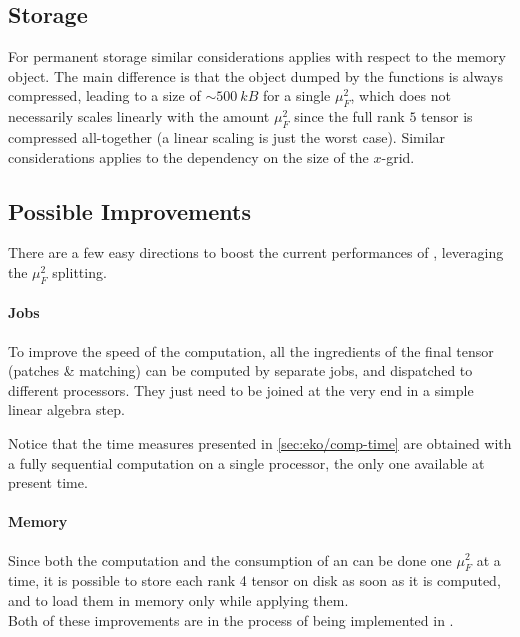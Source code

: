 \subsection{Storage}
\label{sec:eko/storage}

For permanent storage similar considerations applies with respect to the
memory object.
The main difference is that the object dumped by the \eko{} functions is always
compressed, leading to a size of $\sim \SI{500}{kB}$ for a single $\mu_F^2$,
which does not necessarily scales linearly with the amount $\mu_F^2$ since the
full rank $5$ tensor is compressed all-together (a linear scaling is just
the worst case).
Similar considerations applies to the dependency on the size of the $x$-grid.

\subsection{Possible Improvements}

There are a few easy directions to boost the current performances
of \eko{}, leveraging the $\mu_F^2$ splitting.

\paragraph{Jobs} To improve the speed of the computation, all the ingredients
of the final tensor (patches \& matching) can be computed by separate jobs, and
dispatched to different processors.
They just need to be joined at the very end in a simple linear algebra step.

Notice that the time measures presented in \cref{sec:eko/comp-time} are
obtained with a fully sequential computation on a single processor, the only
one available at present time.

\paragraph{Memory} Since both the computation and the consumption of an \eko{}
can be done one $\mu_F^2$ at a time, it is possible to store each rank 4 tensor
on disk as soon as it is computed, and to load them in memory only while
applying them.\\

Both of these improvements are in the process of being implemented in \eko{}.
